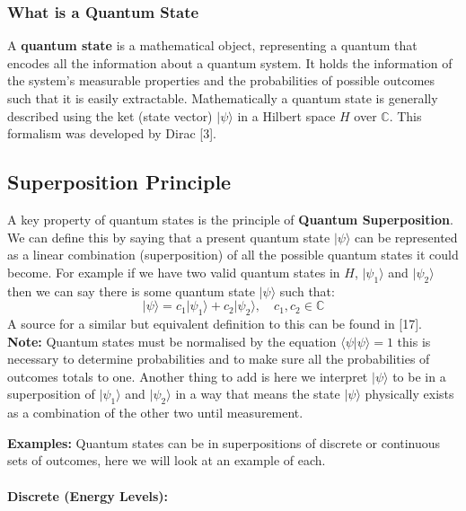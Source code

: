 \subsubsection{What is a Quantum State}
A \textbf{quantum state} is a mathematical object, representing a quantum  that encodes all the information about a quantum system. It holds the information of the system's measurable properties and the probabilities of possible outcomes such that it is easily extractable. Mathematically a quantum state is generally described using the ket (state vector) \( | \psi \rangle \) in a Hilbert space $H$ over $\mathbb{C}$.  This formalism was developed by Dirac [3].

\subsection{Superposition Principle}
A key property of quantum states is the principle of \textbf{Quantum Superposition}. We can define this by saying that a present quantum state \( | \psi \rangle \) can be represented as a linear combination (superposition) of all the possible quantum states it could become. For example if we have two valid quantum states in $H$, \( | \psi_1 \rangle \) and \( | \psi_2 \rangle \) then we can say there is some quantum state \( | \psi \rangle \) such that:
\begin{equation}
     | \psi \rangle  = c_1 | \psi_1 \rangle + c_2 | \psi_2 \rangle, \quad c_1, c_2 \in \mathbb{C}
\end{equation}
A source for a similar but equivalent definition to this can be found in [17].\\
\noindent\textbf{Note:} Quantum states must be normalised by the equation \( \langle \psi| \psi \rangle = 1 \) this is necessary to determine probabilities and to make sure all the probabilities of outcomes totals to one. Another thing to add is here we interpret \( | \psi \rangle \) to be in a superposition of 
\( | \psi_1 \rangle \) and \( | \psi_2 \rangle \) in a way that means the state \( | \psi \rangle \) physically exists as a combination of the other two until measurement.

\noindent\textbf{Examples:}
Quantum states can be in superpositions of discrete or continuous sets of outcomes, here we will look at an example of each.

\paragraph{Discrete (Energy Levels):}

